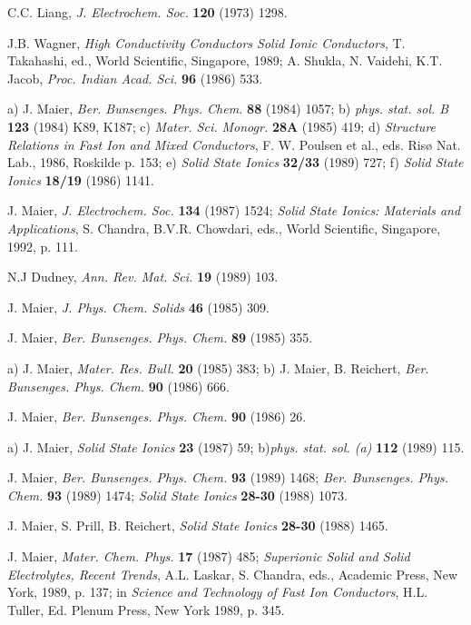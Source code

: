 \documentclass{elsart}
\begin{document}
\begin{thebibliography}{999}
 C.C. Liang, {\em J. Electrochem. Soc.} {\bf 120} (1973) 1298.

 J.B. Wagner, {\em High Conductivity Conductors Solid Ionic
Conductors\/}, T. Takahashi, ed., World Scientific, Singapore, 1989; A. Shukla,
N. Vaidehi, K.T. Jacob, {\em Proc. Indian Acad. Sci.\/} {\bf 96} (1986) 533.

 a) J. Maier, {\em Ber. Bunsenges. Phys. Chem.\/} {\bf 88} (1984)
  1057;  
b) {\em phys. stat. sol. B\/} {\bf 123} (1984) K89, K187; 
c) {\em Mater. Sci. Monogr.\/} {\bf 28A} (1985) 419; 
d) {\em Structure Relations in Fast Ion and Mixed Conductors\/}, F. W. Poulsen
et al., eds. Ris\o{} Nat. Lab., 1986, Roskilde p. 153;
e) {\em Solid State Ionics} {\bf 32/33} (1989) 727; 
f) {\em Solid State Ionics\/} {\bf 18/19} (1986) 1141.   

 J. Maier, {\em J. Electrochem. Soc.\/} {\bf 134} (1987) 1524;
{\em Solid State Ionics: Materials and Applications\/}, S. Chandra, B.V.R.
Chowdari, eds., World Scientific, Singapore, 1992, p. 111.  

 N.J Dudney, {\em Ann. Rev. Mat. Sci.\/} {\bf 19} (1989) 103.

 J. Maier, {\em J. Phys. Chem. Solids\/}  {\bf 46} (1985) 309. 

 J. Maier, {\em Ber. Bunsenges. Phys. Chem.\/}  {\bf 89} (1985)
  355.  

  a) J. Maier, {\em Mater. Res. Bull.\/} {\bf 20} (1985) 383; b)
J. Maier, B. Reichert, {\em Ber. Bunsenges. Phys. Chem.\/} {\bf 90} (1986)
666.   

 J. Maier, {\em Ber. Bunsenges. Phys. Chem.\/} {\bf 90} (1986)
  26.  

 a) J. Maier, {\em Solid State Ionics\/} {\bf 23} (1987) 59;
b){\em phys. stat. sol. (a)\/} {\bf 112} (1989) 115.

 J. Maier, {\em Ber. Bunsenges. Phys. Chem.\/} {\bf 93} (1989)
  1468; {\em Ber. Bunsenges. Phys. Chem.\/} {\bf 93} (1989) 1474;  
{\em Solid State Ionics\/} {\bf 28-30} (1988) 1073.

 J. Maier, S. Prill, B. Reichert, {\em Solid State Ionics\/} {\bf 
28-30} (1988) 1465.

 J. Maier, {\em Mater. Chem. Phys.\/} {\bf 17} (1987) 485; {\em
Superionic Solid and Solid Electrolytes, Recent Trends\/}, A.L. Laskar, S.
Chandra, eds., Academic Press, New York, 1989, p. 137; in {\em Science and
  Technology of Fast Ion Conductors\/}, H.L. Tuller, Ed. Plenum Press, New
York 1989, p. 345. 


\end{thebibliography}
\end{document}
